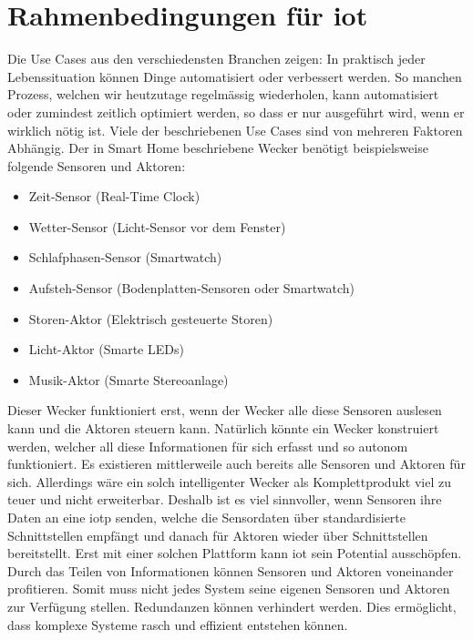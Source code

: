 \chapter{Rahmenbedingungen für \gls{iot}} \label{Rahmenbedingungen für iot}
Die Use Cases aus den verschiedensten Branchen zeigen: In praktisch jeder Lebenssituation können Dinge automatisiert oder verbessert werden. So manchen Prozess, welchen wir heutzutage regelmässig wiederholen, kann automatisiert oder zumindest zeitlich optimiert werden, so dass er nur ausgeführt wird, wenn er wirklich nötig ist. Viele der beschriebenen Use Cases sind von mehreren Faktoren Abhängig. Der in Smart Home beschriebene Wecker benötigt beispielsweise folgende Sensoren und Aktoren:
\begin{itemize}  
  \item Zeit-Sensor (Real-Time Clock)
  \item Wetter-Sensor (Licht-Sensor vor dem Fenster)
  \item Schlafphasen-Sensor (Smartwatch)
  \item Aufsteh-Sensor (Bodenplatten-Sensoren oder Smartwatch)
  \item Storen-Aktor (Elektrisch gesteuerte Storen)
  \item Licht-Aktor (Smarte LEDs)
  \item Musik-Aktor (Smarte Stereoanlage)
\end{itemize}
Dieser Wecker funktioniert erst, wenn der Wecker alle diese Sensoren auslesen kann und die Aktoren steuern kann. Natürlich könnte ein Wecker konstruiert werden, welcher all diese Informationen für sich erfasst und so autonom funktioniert. Es existieren mittlerweile auch bereits alle Sensoren und Aktoren für sich. Allerdings wäre ein solch intelligenter Wecker als Komplettprodukt viel zu teuer und nicht erweiterbar. Deshalb ist es viel sinnvoller, wenn Sensoren ihre Daten an eine \gls{iotp} senden, welche die Sensordaten über standardisierte Schnittstellen empfängt und danach für Aktoren wieder über Schnittstellen bereitstellt. Erst mit einer solchen Plattform kann \gls{iot} sein Potential ausschöpfen. Durch das Teilen von Informationen können Sensoren und Aktoren voneinander profitieren.
Somit muss nicht jedes System seine eigenen Sensoren und Aktoren zur Verfügung stellen. Redundanzen können verhindert werden. Dies ermöglicht, dass komplexe Systeme rasch und effizient entstehen können.  

